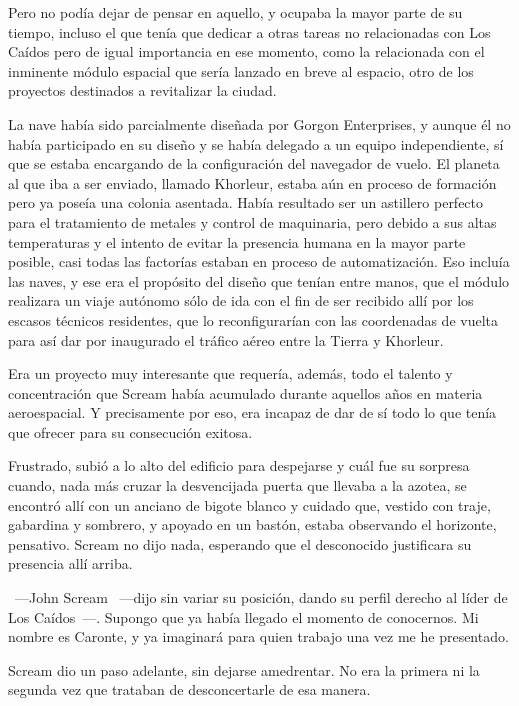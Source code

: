 Pero no podía dejar de pensar en aquello, y ocupaba la mayor parte de su tiempo, incluso el que tenía que dedicar a otras tareas no relacionadas con Los Caídos pero de igual importancia en ese momento, como la relacionada con el inminente módulo espacial que sería lanzado en breve al espacio, otro de los proyectos destinados a revitalizar la ciudad.

La nave había sido parcialmente diseñada por Gorgon Enterprises, y aunque él no había participado en su diseño y se había delegado a un equipo independiente, sí que se estaba encargando de la configuración del navegador de vuelo. El planeta al que iba a ser enviado, llamado Khorleur, estaba aún en proceso de formación pero ya poseía una colonia asentada. Había resultado ser un astillero perfecto para el tratamiento de metales y control de maquinaria, pero debido a sus altas temperaturas y el intento de evitar la presencia humana en la mayor parte posible, casi todas las factorías estaban en proceso de automatización. Eso incluía las naves, y ese era el propósito del diseño que tenían entre manos, que el módulo realizara un viaje autónomo sólo de ida con el fin de ser recibido allí por los escasos técnicos residentes, que lo reconfigurarían con las coordenadas de vuelta para así dar por inaugurado el tráfico aéreo entre la Tierra y Khorleur.

Era un proyecto muy interesante que requería, además, todo el talento y concentración que Scream había acumulado durante aquellos años en materia aeroespacial. Y precisamente por eso, era incapaz de dar de sí todo lo que tenía que ofrecer para su consecución exitosa.

Frustrado, subió a lo alto del edificio para despejarse y cuál fue su sorpresa cuando, nada más cruzar la desvencijada puerta que llevaba a la azotea, se encontró allí con un anciano de bigote blanco y cuidado que, vestido con traje, gabardina y sombrero, y apoyado en un bastón, estaba observando el horizonte, pensativo. Scream no dijo nada, esperando que el desconocido justificara su presencia allí arriba.

~---John Scream ~---dijo sin variar su posición, dando su perfil derecho al líder de Los Caídos~---. Supongo que ya había llegado el momento de conocernos. Mi nombre es Caronte, y ya imaginará para quien trabajo una vez me he presentado.

Scream dio un paso adelante, sin dejarse amedrentar. No era la primera ni la segunda vez que trataban de desconcertarle de esa manera.


